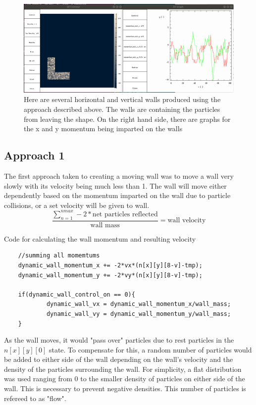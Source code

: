 \documentclass{article}
\begin{document}
\begin{figure}[H]
\includegraphics[scale=0.2]{p1_noleakage.png}
\caption{\label{fig} Here are several horizontal and vertical walls produced using the approach described above. The walls are containing the particles from leaving the shape. On the right hand side, there are graphs for the x and y momentum being imparted on the walls}
\end{figure}

\subsection{Approach 1}

The first approach taken to creating a moving wall was to move a wall very slowly with its velocity being much less than 1. The wall will move either dependently based on the momentum imparted on the wall due to particle collisions, or a set velocity will be given to wall.
 $$\frac{\sum_{n=1}^{nmax} -2*\textrm{net particles reflected}}{\textrm{wall mass}} = \textrm{wall velocity}$$
\vspace{5mm}

Code for calculating the wall momentum and resulting velocity
\begin{verbatim}
    //summing all momemtums
    dynamic_wall_momentum_x += -2*vx*(n[x][y][8-v]-tmp);
    dynamic_wall_momentum_y += -2*vy*(n[x][y][8-v]-tmp);

	if(dynamic_wall_control_on == 0){
    		dynamic_wall_vx = dynamic_wall_momentum_x/wall_mass;
    		dynamic_wall_vy = dynamic_wall_momentum_y/wall_mass;
	}
\end{verbatim}
\vspace{5mm}

As the wall moves, it would "pass over" particles due to rest particles in the $n[x][y][0]$ state. To compensate for this, a random number of particles would be added to either side of the wall depending on the wall's velocity and the density of the particles surrounding the wall. For simplicity, a flat distribution was used ranging from 0 to the smaller density of particles on either side of the wall. This is necessary to prevent negative densities. This number of particles is refereed to as "flow".
\end{document}
